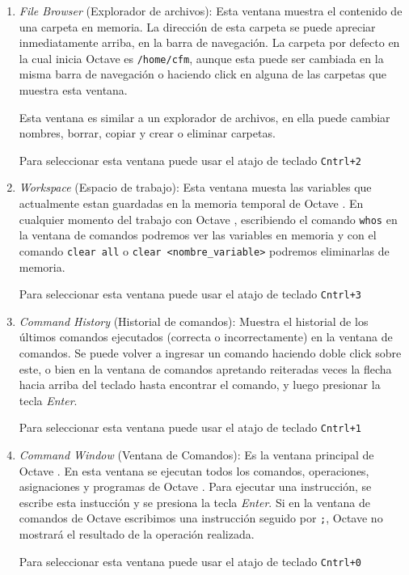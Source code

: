 \documentclass[letter,11pt]{article}
\newcommand\0{\mathbf{0}}
\newcommand{\octave}{{\sc Octave }}
\begin{document}
\begin{enumerate}
\item \emph{File Browser} (Explorador de archivos): Esta ventana muestra el contenido de una carpeta en memoria. La direcci\'on de esta carpeta se puede apreciar inmediatamente arriba, en la barra de navegaci\'on. La carpeta por defecto en la cual inicia \octave  es \verb"/home/cfm", aunque esta puede ser cambiada en la misma barra de navegaci\'on o haciendo click en alguna de las carpetas que muestra esta ventana.

Esta ventana es similar a un explorador de archivos, en ella puede cambiar nombres, borrar, copiar y crear o eliminar carpetas.


Para seleccionar  esta ventana puede usar el atajo de teclado \verb"Cntrl+2"

\item \emph{Workspace} (Espacio de trabajo): Esta ventana muesta las variables que actualmente estan guardadas en la memoria temporal de \octave. En cualquier momento del trabajo con \octave, escribiendo el comando \Verb+whos+ en la ventana de comandos podremos ver	las variables en memoria y con el comando \Verb+clear all+ o \verb"clear <nombre_variable>" podremos eliminarlas de memoria.

Para seleccionar  esta ventana puede usar el atajo de teclado \verb"Cntrl+3"

\item \emph{Command History} (Historial de comandos): Muestra el historial de los \'ultimos comandos ejecutados (correcta o incorrectamente) en la ventana de comandos. Se puede volver a ingresar un comando haciendo doble click sobre este, o bien en la ventana de comandos apretando reiteradas veces la flecha hacia arriba del teclado  hasta encontrar el comando, y luego presionar la tecla \emph{Enter}.

Para seleccionar  esta ventana puede usar el atajo de teclado \verb"Cntrl+1"

\item \emph{Command Window} (Ventana de Comandos):  Es la ventana principal de \octave. En esta ventana se ejecutan todos los comandos, operaciones, asignaciones y programas de \octave. Para ejecutar una instrucci\'on, se escribe esta instucci\'on y se presiona la tecla \emph{Enter}. Si en la ventana de comandos de \octave escribimos una instrucci\'on seguido por \verb+;+, \octave{}	no mostrar\'a el resultado de la operaci\'on realizada.

Para seleccionar  esta ventana puede usar el atajo de teclado \verb"Cntrl+0"

\end{enumerate}
\end{document}
